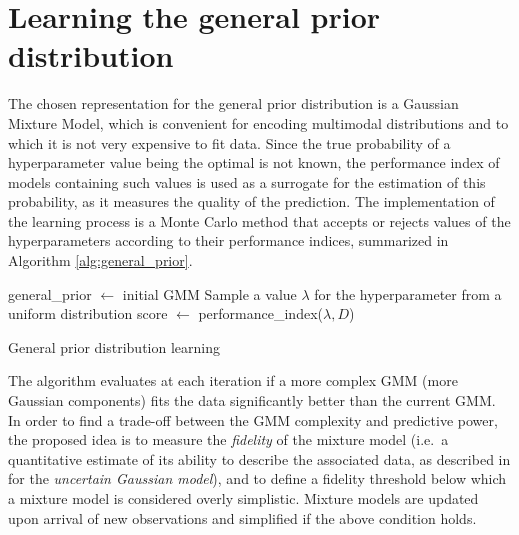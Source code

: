 	\section{Learning the general prior distribution}
	\label{sec:learning_prior}

	The chosen representation for the general prior distribution is a Gaussian Mixture Model, which
	is convenient for encoding multimodal distributions and to which it is not very expensive to fit
	data. Since the true probability of a hyperparameter value being the optimal is not known, the
	performance index of models containing such values is used as a surrogate for the estimation of
	this probability, as it measures the quality of the prediction. 
	The implementation of the learning process is a Monte Carlo method that accepts or rejects
	values of the hyperparameters according to their performance indices, summarized in Algorithm
	\ref{alg:general_prior}.

	\begin{algorithm}[here]
		\begin{algorithmic}
				\State general\_prior $\gets$ initial GMM
						\State Sample a value $\lambda$ for the hyperparameter from a uniform
						distribution
						\State score $\gets$ performance\_index($\lambda, D$)
							\State {}
							\State {}
						\EndIf
					\EndWhile
				\EndFor
				\State
			\EndFunction
		\end{algorithmic}
		\caption{General prior distribution learning}
		\label{alg:general_prior}
	\end{algorithm}

	The algorithm evaluates at each iteration if a more complex GMM (more Gaussian components) fits
	the data significantly better than the current GMM.  In order to find a trade-off between the
	GMM complexity and predictive power, the proposed idea is to measure the \emph{fidelity} of the
	mixture model (i.e.~a quantitative estimate of its ability to describe the associated data, as
	described in \cite{declercq2007online, declercq2008online} for the \emph{uncertain Gaussian
	model}), and to define a fidelity threshold below which a mixture model is considered overly
	simplistic. Mixture models are updated upon arrival of new observations and simplified if
	the above condition holds.

